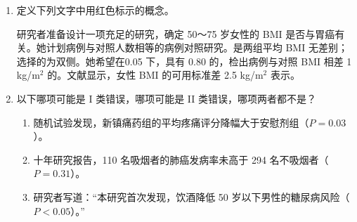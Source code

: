\begin{enumerate}
\item 定义下列文字中用红色标示的概念。

研究者准备设计一项充足的研究，确定 50～75 岁女性的 BMI 是否与胃癌有关。她计划病例与对照人数相等的病例对照研究。是两组平均 BMI 无差别；选择的为双侧。她希望在0.05 下，具有 0.80 的，检出病例与对照 BMI 相差 1 kg/m$^2$ 的。文献显示，女性 BMI 的可用标准差 2.5 kg/m$^2$ 表示。
\item 以下哪项可能是 I 类错误，哪项可能是 II 类错误，哪项两者都不是？
\begin{enumerate}
\item 随机试验发现，新镇痛药组的平均疼痛评分降幅大于安慰剂组（$P=0.03$）。
\item 十年研究报告，110 名吸烟者的肺癌发病率未高于 294 名不吸烟者（$P=0.31$）。
\item 研究者写道：“本研究首次发现，饮酒降低 50 岁以下男性的糖尿病风险（$P<0.05$）。”
\end{enumerate}
\end{enumerate}
